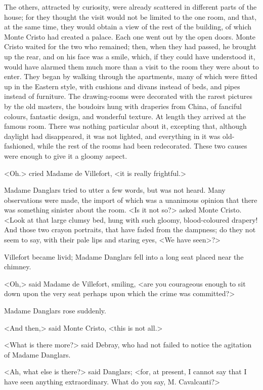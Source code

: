  The others, attracted by curiosity, were already scattered in different parts of the house; for they thought the visit would not be limited to the one room, and that, at the same time, they would obtain a view of the rest of the building, of which Monte Cristo had created a palace. Each one went out by the open doors. Monte Cristo waited for the two who remained; then, when they had passed, he brought up the rear, and on his face was a smile, which, if they could have understood it, would have alarmed them much more than a visit to the room they were about to enter. They began by walking through the apartments, many of which were fitted up in the Eastern style, with cushions and divans instead of beds, and pipes instead of furniture. The drawing-rooms were decorated with the rarest pictures by the old masters, the boudoirs hung with draperies from China, of fanciful colours, fantastic design, and wonderful texture. At length they arrived at the famous room. There was nothing particular about it, excepting that, although daylight had disappeared, it was not lighted, and everything in it was old-fashioned, while the rest of the rooms had been redecorated. These two causes were enough to give it a gloomy aspect. 

 <Oh.> cried Madame de Villefort, <it is really frightful.> 

 Madame Danglars tried to utter a few words, but was not heard. Many observations were made, the import of which was a unanimous opinion that there was something sinister about the room.  <Is it not so?> asked Monte Cristo. <Look at that large clumsy bed, hung with such gloomy, blood-coloured drapery! And those two crayon portraits, that have faded from the dampness; do they not seem to say, with their pale lips and staring eyes, <We have seen>?> 

 Villefort became livid; Madame Danglars fell into a long seat placed near the chimney. 

 <Oh,> said Madame de Villefort, smiling, <are you courageous enough to sit down upon the very seat perhaps upon which the crime was committed?> 

 Madame Danglars rose suddenly. 

 <And then,> said Monte Cristo, <this is not all.> 

 <What is there more?> said Debray, who had not failed to notice the agitation of Madame Danglars. 

 <Ah, what else is there?> said Danglars; <for, at present, I cannot say that I have seen anything extraordinary. What do you say, M. Cavalcanti?> 

